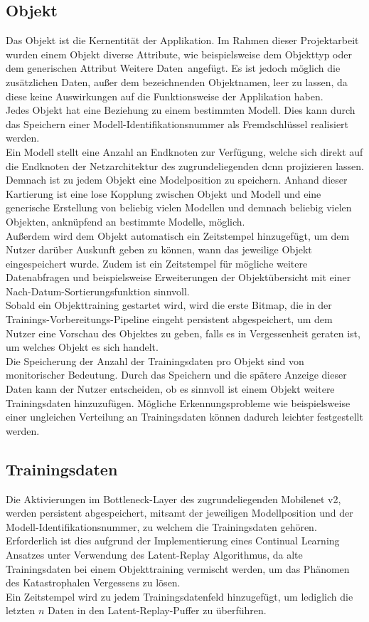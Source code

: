 \documentclass[oneside]{ausarbeitung}
\begin{document}
\subsection{Objekt}
Das Objekt ist die Kernentität der Applikation. Im Rahmen dieser Projektarbeit wurden einem Objekt diverse Attribute, wie beispielsweise dem Objekttyp oder dem generischen Attribut \glqq Weitere Daten\grqq\ angefügt. Es ist jedoch möglich die zusätzlichen Daten, außer dem bezeichnenden Objektnamen, leer zu lassen, da diese keine Auswirkungen auf die Funktionsweise der Applikation haben.\\
Jedes Objekt hat eine Beziehung zu einem bestimmten Modell. Dies kann durch das Speichern einer Modell-Identifikationsnummer als Fremdschlüssel realisiert werden.\\
Ein Modell stellt eine Anzahl an Endknoten zur Verfügung, welche sich direkt auf die Endknoten der Netzarchitektur des zugrundeliegenden \ac{dcnn} projizieren lassen. Demnach ist zu jedem Objekt eine Modelposition zu speichern. Anhand dieser Kartierung ist eine lose Kopplung zwischen Objekt und Modell und eine generische Erstellung von beliebig vielen Modellen und demnach beliebig vielen Objekten, anknüpfend an bestimmte Modelle, möglich.\\ 
Außerdem wird dem Objekt automatisch ein Zeitstempel hinzugefügt, um dem Nutzer darüber Auskunft geben zu können, wann das jeweilige Objekt eingespeichert wurde. Zudem ist ein Zeitstempel für mögliche weitere Datenabfragen und beispielsweise Erweiterungen der Objektübersicht mit einer Nach-Datum-Sortierungsfunktion sinnvoll.\\
Sobald ein Objekttraining gestartet wird, wird die erste Bitmap, die in der Trainings-Vorbereitungs-Pipeline eingeht persistent abgespeichert, um dem Nutzer eine Vorschau des Objektes zu geben, falls es in Vergessenheit geraten ist, um welches Objekt es sich handelt.\\
Die Speicherung der Anzahl der Trainingsdaten pro Objekt sind von monitorischer Bedeutung. Durch das Speichern und die spätere Anzeige dieser Daten kann der Nutzer entscheiden, ob es sinnvoll ist einem Objekt weitere Trainingsdaten hinzuzufügen. Mögliche Erkennungsprobleme wie beispielsweise einer ungleichen Verteilung an Trainingsdaten können dadurch leichter festgestellt werden.\\
\subsection{Trainingsdaten}
Die Aktivierungen im Bottleneck-Layer des zugrundeliegenden Mobilenet v2, werden persistent abgespeichert, mitsamt der jeweiligen Modellposition und der Modell-Identifikationsnummer, zu welchem die Trainingsdaten gehören. Erforderlich ist dies aufgrund der Implementierung eines Continual Learning Ansatzes unter Verwendung des Latent-Replay Algorithmus, da alte Trainingsdaten bei einem Objekttraining vermischt werden, um das Phänomen des Katastrophalen Vergessens zu lösen.\\
Ein Zeitstempel wird zu jedem Trainingsdatenfeld hinzugefügt, um lediglich die letzten $n$ Daten in den Latent-Replay-Puffer zu überführen.
\end{document}
